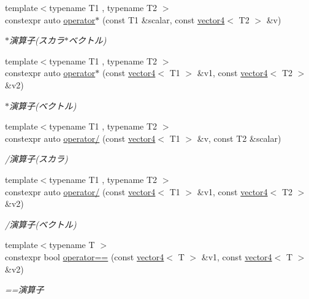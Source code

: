 \begin{DoxyCompactItemize}
{\footnotesize template$<$typename T1 , typename T2 $>$ }\\constexpr auto \mbox{\hyperlink{namespacesaki_ad1caaaf5b1af879f2d546a4b2e10974e}{operator$\ast$}} (const T1 \&scalar, const \mbox{\hyperlink{classsaki_1_1vector4}{vector4}}$<$ T2 $>$ \&v)
\begin{DoxyCompactList}\small\item\em $\ast$演算子(スカラ$\ast$ベクトル) \end{DoxyCompactList}\item 
{\footnotesize template$<$typename T1 , typename T2 $>$ }\\constexpr auto \mbox{\hyperlink{namespacesaki_a19656e376d8720e2a67f3d08082770b0}{operator$\ast$}} (const \mbox{\hyperlink{classsaki_1_1vector4}{vector4}}$<$ T1 $>$ \&v1, const \mbox{\hyperlink{classsaki_1_1vector4}{vector4}}$<$ T2 $>$ \&v2)
\begin{DoxyCompactList}\small\item\em $\ast$演算子(ベクトル) \end{DoxyCompactList}\item 
{\footnotesize template$<$typename T1 , typename T2 $>$ }\\constexpr auto \mbox{\hyperlink{namespacesaki_a5525c6da34ded0620ee6d965e687bedc}{operator/}} (const \mbox{\hyperlink{classsaki_1_1vector4}{vector4}}$<$ T1 $>$ \&v, const T2 \&scalar)
\begin{DoxyCompactList}\small\item\em /演算子(スカラ) \end{DoxyCompactList}\item 
{\footnotesize template$<$typename T1 , typename T2 $>$ }\\constexpr auto \mbox{\hyperlink{namespacesaki_ac72c945dc5e1e8fe6065beac4a310a54}{operator/}} (const \mbox{\hyperlink{classsaki_1_1vector4}{vector4}}$<$ T1 $>$ \&v1, const \mbox{\hyperlink{classsaki_1_1vector4}{vector4}}$<$ T2 $>$ \&v2)
\begin{DoxyCompactList}\small\item\em /演算子(ベクトル) \end{DoxyCompactList}\item 
{\footnotesize template$<$typename T $>$ }\\constexpr bool \mbox{\hyperlink{namespacesaki_abe77ceb7257097320a66f9f182d11111}{operator==}} (const \mbox{\hyperlink{classsaki_1_1vector4}{vector4}}$<$ T $>$ \&v1, const \mbox{\hyperlink{classsaki_1_1vector4}{vector4}}$<$ T $>$ \&v2)
\begin{DoxyCompactList}\small\item\em ==演算子 \end{DoxyCompactList}\item 

\end{DoxyCompactItemize}
